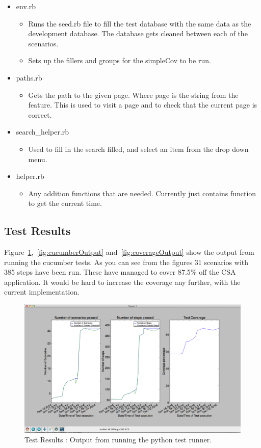 \documentclass[10pt,a4paper,titlepage]{article}
\begin{document}
\begin{itemize}
\item env.rb
	\begin{itemize}
	\item Runs the seed.rb file to fill the test database with the same data as the development database. The database gets cleaned between each of the scenarios. 
	\item Sets up the fillers and groups for the simpleCov to be run.
	\end{itemize}
\item paths.rb
	\begin{itemize}
	\item Gets the path to the given page. Where page is the string from the feature. This is used to visit a page and to check that the current page is correct.
	\end{itemize}
\item search\_helper.rb
	\begin{itemize}
	\item Used to fill in the search filled, and select an item from the drop down menu.
	\end{itemize}
\item helper.rb
	\begin{itemize}
	\item Any addition functions that are needed. Currently just contains function to get the current time.
	\end{itemize}
\end{itemize}

\subsection{Test Results}

Figure~\ref{fig:graphOutput},~\ref{fig:cucumberOutput} and~\ref{fig:coverageOutput} show the output from running the cucumber tests. As you can see from the figures 31 scenarios with 385 steps have been run. These have managed to cover 87.5\% off the CSA application. It would be hard to increase the coverage any further, with the current implementation.

\begin{figure}[H]
\begin{center}
\includegraphics[scale=0.35]{include/graphOutput.png}  
\caption{Test Results : Output from running the python test runner. }
\label{fig:graphOutput}
\end{center}
\end{figure}
\end{document}
